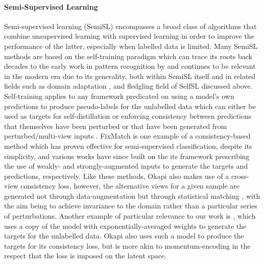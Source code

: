 \paragraph{Semi-Supervised Learning}  
Semi-supervised learning (SemiSL) encompasses a broad class of algorithms that combine unsupervised
learning with supervised learning in order to improve the performance of the latter, especially
when labelled data is limited.
%
Many \ac{SemiSL} methods are based on the self-training paradigm which can trace its roots back
decades to the early work in pattern recognition by \cite{scudder1965probability} and continues to
be relevant in the modern era due to its generality, both within \ac{SemiSL} itself and in related
fields such as domain adaptation \citep{ganin2016domain}, and fledgling field of \ac{SelfSL}
\citep{caron2021emerging} discussed above.
%
Self-training applies to any framework predicated on using a model's own predictions to produce
pseudo-labels for the unlabelled data which can either be used as targets for self-distillation
\citep{xie2020self} or enforcing consistency between predictions that themselves have been
perturbed \citep{bachman2014learning, xie2020self} or that have been generated from
perturbed/multi-view inputs \citep{sohn2020fixmatch}.
%
FixMatch \citep{sohn2020fixmatch} is one example of a consistency-based method which has proven
effective for semi-supervised classification, despite its simplicity, and various works
\citep{gong2021alphamatch, lienen2021credal} have since built on the its framework prescribing the
use of weakly- and strongly-augmented inputs to generate the targets and predictions, respectively.
%
Like these methods, Okapi also makes use of a cross-view consistency loss, however, the alternative
views for a given sample are generated not through data-augmentation but through statistical
matching \citep{rosenbaum1983central}, with the aim being to achieve invariance to the domain
rather than a particular series of perturbations.
%
Another example of particular relevance to our work is \cite{tarvainen2017mean}, which uses a copy
of the model with exponentially-averaged weights to generate the targets for the unlabelled data.
Okapi also uses such a model to produce the targets for its consistency loss, but is more akin to
momentum-encoding \citep{he2020momentum} in the respect that the loss is imposed on the latent
space.
